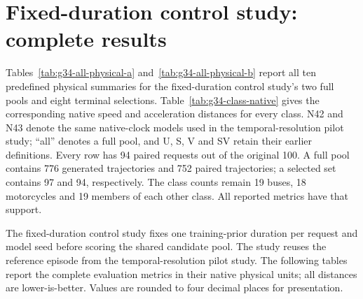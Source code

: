 \FloatBarrier

\section{Fixed-duration control study: complete results}
\label{sec:g34-appendix}
Tables~\ref{tab:g34-all-physical-a} and~\ref{tab:g34-all-physical-b} report all ten predefined physical summaries for the fixed-duration control study's two full pools and eight terminal selections. Table~\ref{tab:g34-class-native} gives the corresponding native speed and acceleration distances for every class. N42 and N43 denote the same native-clock models used in the temporal-resolution pilot study; ``all'' denotes a full pool, and U, S, V and SV retain their earlier definitions. Every row has 94 paired requests out of the original 100. A full pool contains 776 generated trajectories and 752 paired trajectories; a selected set contains 97 and 94, respectively. The class counts remain 19 buses, 18 motorcycles and 19 members of each other class. All reported metrics have that support.

The fixed-duration control study fixes one training-prior duration per request and model seed before scoring the shared candidate pool. The study reuses the reference episode from the temporal-resolution pilot study. The following tables report the complete evaluation metrics in their native physical units; all distances are lower-is-better. Values are rounded to four decimal places for presentation.

